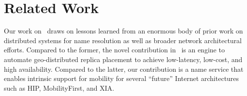 %





\vspace{-0.1in}
\section{Related Work}
\label{sec:related}


Our work on \auspice\ draws on lessons learned from an enormous body of prior work on distributed systems for name resolution as well as broader network architectural efforts. Compared to the former, the novel contribution in \auspice\ is an engine to {automate} geo-distributed replica placement to achieve low-latency, low-cost, and high availability.  Compared to the latter, our contribution is a name service that enables intrinsic support for mobility for several ``future'' Internet architectures such as HIP, MobilityFirst, and XIA.

